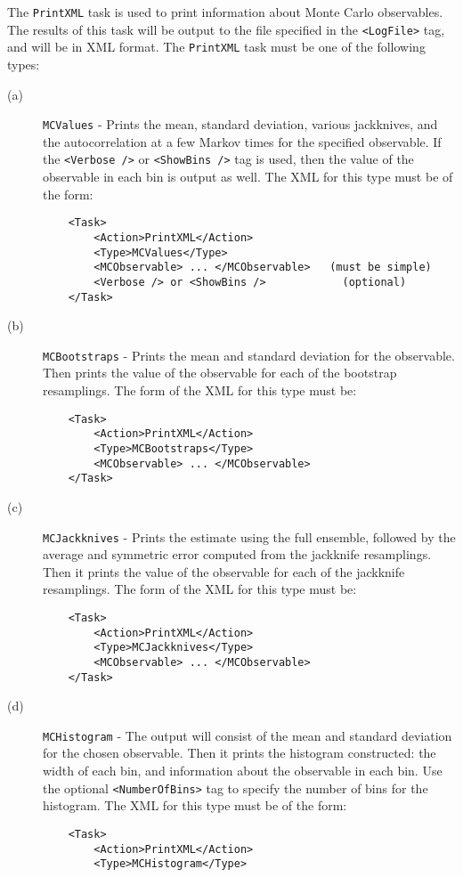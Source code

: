 \documentclass[12pt]{article}
\newcommand{\vb}{\texttt}
\begin{document}
The \vb{PrintXML} task is used to print information about Monte Carlo observables.
The results of this task will be output to the file specified in the
\vb{<LogFile>} tag, and will be in XML format.
The \vb{PrintXML} task must be one of the following types:
\begin{description}
\item[(a)] \vb{MCValues} - Prints the mean, standard deviation, various jackknives, and
  the autocorrelation at a few Markov times for the specified observable.
  If the \vb{<Verbose />} or \vb{<ShowBins />} tag is used, then the value of the observable in
  each bin is output as well. The XML for this type must be of the form:
\begin{verbatim}
    <Task>
        <Action>PrintXML</Action>
        <Type>MCValues</Type>
        <MCObservable> ... </MCObservable>   (must be simple)
        <Verbose /> or <ShowBins />            (optional)
    </Task>
\end{verbatim}
\item[(b)] \vb{MCBootstraps} - Prints the mean and standard deviation for the observable.
  Then prints the value of the observable for each of the bootstrap resamplings.
  The form of the XML for this type must be:
\begin{verbatim}
    <Task>
        <Action>PrintXML</Action>
        <Type>MCBootstraps</Type>
        <MCObservable> ... </MCObservable>
    </Task>
\end{verbatim}
\item[(c)] \vb{MCJackknives} - Prints the estimate using the full ensemble, followed by
the average and symmetric error computed from the jackknife resamplings.
Then it prints the value of the observable for each of the jackknife resamplings.
The form of the XML for this type must be:
\begin{verbatim}
    <Task>
        <Action>PrintXML</Action>
        <Type>MCJackknives</Type>
        <MCObservable> ... </MCObservable>
    </Task>
\end{verbatim}
\item[(d)] \vb{MCHistogram} - The output will consist of the mean and standard deviation for the chosen
  observable. Then it prints the histogram constructed: the width of each bin, and information
  about the observable in each bin.
  Use the optional \vb{<NumberOfBins>} tag to specify the number of
  bins for the histogram. The XML for this type must be of the form:
\begin{verbatim}
    <Task>
        <Action>PrintXML</Action>
        <Type>MCHistogram</Type>

\end{verbatim}
\end{description}
\end{document}
